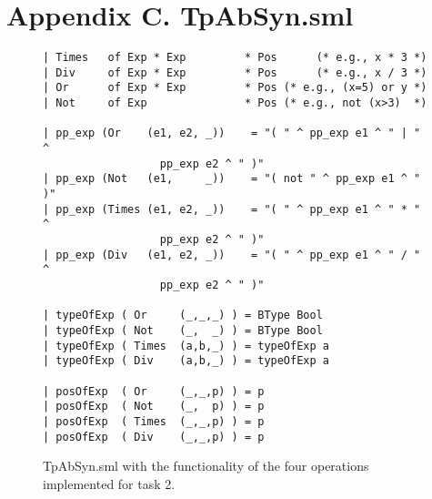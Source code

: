 \documentclass[12pt,a4paper,english]{article}
\begin{document}
\newpage
\section{Appendix C. TpAbSyn.sml}
\begin{figure}[h]
\begin{lstlisting}
| Times   of Exp * Exp         * Pos      (* e.g., x * 3 *)
| Div     of Exp * Exp         * Pos      (* e.g., x / 3 *) 
| Or      of Exp * Exp         * Pos (* e.g., (x=5) or y *)
| Not     of Exp               * Pos (* e.g., not (x>3)  *)

| pp_exp (Or    (e1, e2, _))    = "( " ^ pp_exp e1 ^ " | " ^ 
				  pp_exp e2 ^ " )"
| pp_exp (Not   (e1,     _))    = "( not " ^ pp_exp e1 ^ " )"
| pp_exp (Times (e1, e2, _))    = "( " ^ pp_exp e1 ^ " * " ^ 
				  pp_exp e2 ^ " )"
| pp_exp (Div   (e1, e2, _))    = "( " ^ pp_exp e1 ^ " / " ^
				  pp_exp e2 ^ " )"

| typeOfExp ( Or     (_,_,_) ) = BType Bool
| typeOfExp ( Not    (_,  _) ) = BType Bool
| typeOfExp ( Times  (a,b,_) ) = typeOfExp a
| typeOfExp ( Div    (a,b,_) ) = typeOfExp a

| posOfExp  ( Or     (_,_,p) ) = p
| posOfExp  ( Not    (_,  p) ) = p
| posOfExp  ( Times  (_,_,p) ) = p
| posOfExp  ( Div    (_,_,p) ) = p
\end{lstlisting}
\caption{TpAbSyn.sml with the functionality of the four operations implemented for task 2.}\end{figure}

\newpage
\end{document}

